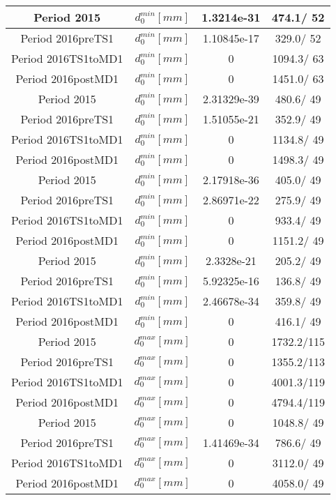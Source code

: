 \documentclass{article}
\begin{document}
\begin{longtable}{c|c|c|c}
\hline
 Period 2015 & $d_{0}^{min} [mm]$ & 1.3214e-31 & 474.1/ 52\\
\hline
 Period 2016preTS1 & $d_{0}^{min} [mm]$ & 1.10845e-17 & 329.0/ 52\\
\hline
 Period 2016TS1toMD1 & $d_{0}^{min} [mm]$ & 0 & 1094.3/ 63\\
\hline
 Period 2016postMD1 & $d_{0}^{min} [mm]$ & 0 & 1451.0/ 63\\
\hline
 Period 2015 & $d_{0}^{min} [mm]$ & 2.31329e-39 & 480.6/ 49\\
\hline
 Period 2016preTS1 & $d_{0}^{min} [mm]$ & 1.51055e-21 & 352.9/ 49\\
\hline
 Period 2016TS1toMD1 & $d_{0}^{min} [mm]$ & 0 & 1134.8/ 49\\
\hline
 Period 2016postMD1 & $d_{0}^{min} [mm]$ & 0 & 1498.3/ 49\\
\hline
 Period 2015 & $d_{0}^{min} [mm]$ & 2.17918e-36 & 405.0/ 49\\
\hline
 Period 2016preTS1 & $d_{0}^{min} [mm]$ & 2.86971e-22 & 275.9/ 49\\
\hline
 Period 2016TS1toMD1 & $d_{0}^{min} [mm]$ & 0 & 933.4/ 49\\
\hline
 Period 2016postMD1 & $d_{0}^{min} [mm]$ & 0 & 1151.2/ 49\\
\hline
 Period 2015 & $d_{0}^{min} [mm]$ & 2.3328e-21 & 205.2/ 49\\
\hline
 Period 2016preTS1 & $d_{0}^{min} [mm]$ & 5.92325e-16 & 136.8/ 49\\
\hline
 Period 2016TS1toMD1 & $d_{0}^{min} [mm]$ & 2.46678e-34 & 359.8/ 49\\
\hline
 Period 2016postMD1 & $d_{0}^{min} [mm]$ & 0 & 416.1/ 49\\
\hline
 Period 2015 & $d_{0}^{max} [mm]$ & 0 & 1732.2/115\\
\hline
 Period 2016preTS1 & $d_{0}^{max} [mm]$ & 0 & 1355.2/113\\
\hline
 Period 2016TS1toMD1 & $d_{0}^{max} [mm]$ & 0 & 4001.3/119\\
\hline
 Period 2016postMD1 & $d_{0}^{max} [mm]$ & 0 & 4794.4/119\\
\hline
 Period 2015 & $d_{0}^{max} [mm]$ & 0 & 1048.8/ 49\\
\hline
 Period 2016preTS1 & $d_{0}^{max} [mm]$ & 1.41469e-34 & 786.6/ 49\\
\hline
 Period 2016TS1toMD1 & $d_{0}^{max} [mm]$ & 0 & 3112.0/ 49\\
\hline
 Period 2016postMD1 & $d_{0}^{max} [mm]$ & 0 & 4058.0/ 49\\

\end{longtable}
\end{document}
